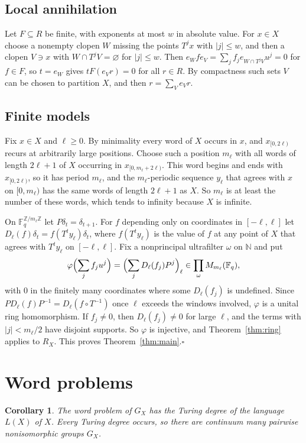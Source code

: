 \documentclass[11pt]{amsart}
\newtheorem{corollary}[theorem]{Corollary}
\newcommand{\F}{\mathbb F}
\newcommand{\Z}{\mathbb Z}
\begin{document}
\subsection*{Local annihilation}
Let $F\subseteq R$ be finite, with exponents at most $w$ in absolute
value. For $x\in X$ choose a nonempty clopen $W$ missing the points
$T^jx$ with $|j|\le w$, and then a clopen $V\ni x$ with
$W\cap T^jV=\varnothing$ for $|j|\le w$. Then
$e_Wfe_V=\sum_jf_je_{W\cap T^jV}u^j=0$ for $f\in F$, so $t=e_W$ gives
$tF(e_Vr)=0$ for all $r\in R$. By compactness such sets $V$ can be chosen
to partition $X$, and then $r=\sum_Ve_Vr$.

\subsection*{Finite models}
Fix $x\in X$ and $\ell\ge0$. By minimality every word of $X$ occurs in
$x$, and $x_{[0,2\ell)}$ recurs at arbitrarily large positions. Choose
such a position $m_\ell$ with all words of length $2\ell+1$ of $X$
occurring in $x_{[0,m_\ell+2\ell)}$. This word begins and ends with
$x_{[0,2\ell)}$, so it has period $m_\ell$, and the $m_\ell$-periodic
sequence $y_\ell$ that agrees with $x$ on $[0,m_\ell)$ has the same words
of length $2\ell+1$ as $X$. So $m_\ell$ is at least the number of these
words, which tends to infinity because $X$ is infinite.

On $\F_q^{\Z/m_\ell\Z}$ let $P\delta_t=\delta_{t+1}$. For $f$ depending only
on coordinates in $[-\ell,\ell]$ let $D_\ell(f)\delta_t=f(T^ty_\ell)\delta_t$,
where $f(T^ty_\ell)$ is the value of $f$ at any point of $X$ that agrees
with $T^ty_\ell$ on $[-\ell,\ell]$. Fix a nonprincipal ultrafilter $\omega$
on $\mathbb N$ and put
\[
 \varphi\Bigl(\sum_jf_ju^j\Bigr)=\Bigl(\sum_jD_\ell(f_j)P^j\Bigr)_\ell
 \in\prod_\omega M_{m_\ell}(\F_q),
\]
with $0$ in the finitely many coordinates where some $D_\ell(f_j)$ is
undefined. Since $PD_\ell(f)P^{-1}=D_\ell(f\circ T^{-1})$ once $\ell$
exceeds the windows involved, $\varphi$ is a unital ring homomorphism. If
$f_j\ne0$, then $D_\ell(f_j)\ne0$ for large $\ell$, and the terms with
$|j|<m_\ell/2$ have disjoint supports. So $\varphi$ is injective, and
Theorem~\ref{thm:ring} applies to $R_X$. This proves
Theorem~\ref{thm:main}.\hfill$\square$

\section{Word problems}

\begin{corollary}
The word problem of $G_X$ has the Turing degree of the language $L(X)$
of $X$. Every Turing degree occurs, so there are continuum many pairwise
nonisomorphic groups $G_X$.
\end{corollary}
\end{document}
